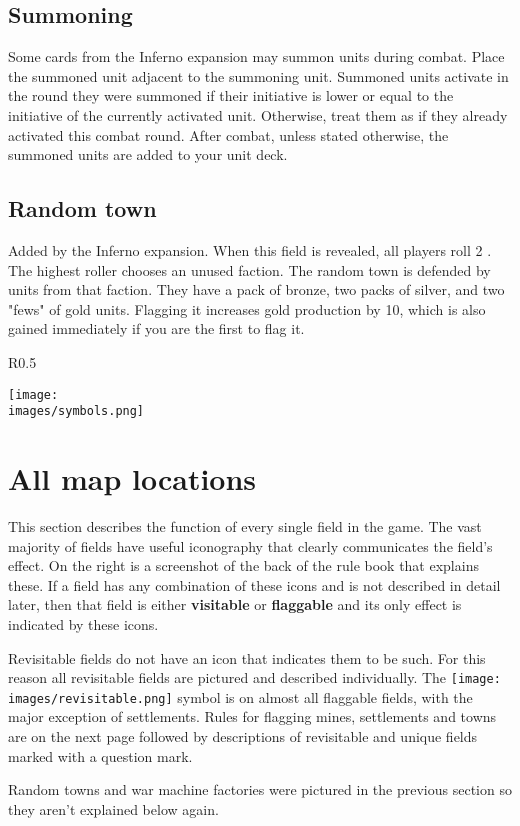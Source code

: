 \documentclass[12pt]{article}
\def\assets{assets}
\def\images{\assets/images}
\def\svgs{\assets/svgs}
\begin{document}
\subsection*{Summoning}
Some cards from the Inferno expansion may summon units during combat. Place the summoned unit adjacent to the summoning unit. Summoned units activate in the round they were summoned if their initiative is lower or equal to the initiative of the currently activated unit. Otherwise, treat them as if they already activated this combat round. After combat, unless stated otherwise, the summoned units are added to your unit deck.
\subsection*{Random town}
Added by the Inferno expansion. When this field is revealed, all players roll 2 . The highest roller chooses an unused faction. The random town is defended by units from that faction. They have a pack of bronze, two packs of silver, and two "fews" of gold units. Flagging it increases gold production by 10, which is also gained immediately if you are the first to flag it.
\clearpage
\begin{wrapfigure}{R}{0.5\textwidth}
    \begin{center}
    \texttt{[image: \\images/symbols.png]}
    \end{center}
\end{wrapfigure}
\section[All map locations]{All map locations\hypertarget{All}{}}

This section describes the function of every single field in the game. The vast majority of fields have useful iconography that clearly communicates the field's effect. On the right is a screenshot of the back of the rule book that explains these. If a field has any combination of these icons and is not described in detail later, then that field is either \textbf{visitable} or \textbf{flaggable} and its only effect is indicated by these icons.\par
Revisitable fields do not have an icon that indicates them to be such. For this reason all revisitable fields are pictured and described individually. The \texttt{[image: \\images/revisitable.png]} symbol is on almost all flaggable fields, with the major exception of settlements. Rules for flagging mines, settlements and towns are on the next page followed by descriptions of revisitable and unique fields marked with a question mark.\par
Random towns and war machine factories were pictured in the previous section so they aren't explained below again.
\end{document}
